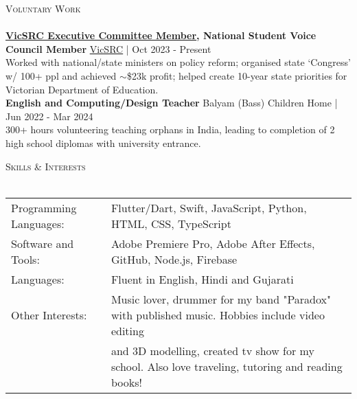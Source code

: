 \documentclass[a4paper]{article}
\newcommand{\lineunder} {
    \vspace*{-8pt} \\
    \hspace*{-10pt} \hrulefill \\
}
\newcommand{\header} [1] {
    {\hspace*{-10pt}\vspace*{6pt} \textsc{#1}}
    \vspace*{-6pt} \lineunder
}
\begin{document}
\header{Voluntary Work}
\textbf{\href{https://vicsrc.org.au/about/executive-committee}{\ul{VicSRC Executive Committee Member}}, National Student Voice Council Member} \hfill \href{https://vicsrc.org.au/}{VicSRC} | Oct 2023 - Present\\
Worked with national/state ministers on policy reform; organised state ‘Congress’ w/ 100+ ppl and achieved $\sim$\$23k profit; helped create 10-year state priorities for Victorian Department of Education.\\
\vspace*{1.5mm}
{\textbf{English and Computing/Design Teacher}} \hfill Balyam (Bass) Children Home | Jun 2022 - Mar 2024\\
300+ hours volunteering teaching orphans in India, leading to completion of 2 high school diplomas with university entrance. \\
\vspace*{1.5mm}

\header{Skills \& Interests}
\begin{tabular}{ l l }
	Programming Languages: & Flutter/Dart, Swift, JavaScript, Python, HTML, CSS, TypeScript     \\
	Software and Tools:    & Adobe Premiere Pro, Adobe After Effects, GitHub, Node.js, Firebase \\
    Languages:    & Fluent in English, Hindi and Gujarati \\
    Other Interests:    & Music lover, drummer for my band "Paradox" with published music. Hobbies include video editing \\
                        & and 3D modelling, created tv show for my school. Also love traveling, tutoring and reading books! \\
\end{tabular}

\vspace*{-80pt}
\end{document}
